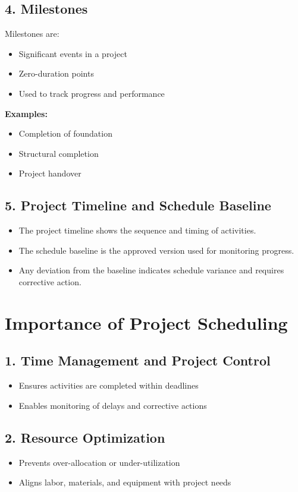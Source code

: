 \documentclass[12pt,a4paper]{article}
\begin{document}
\subsection*{4. Milestones}
Milestones are:
\begin{itemize}
    \item Significant events in a project
    \item Zero-duration points
    \item Used to track progress and performance
\end{itemize}

\textbf{Examples:}
\begin{itemize}
    \item Completion of foundation
    \item Structural completion
    \item Project handover
\end{itemize}

\subsection*{5. Project Timeline and Schedule Baseline}
\begin{itemize}
    \item The project timeline shows the sequence and timing of activities.
    \item The schedule baseline is the approved version used for monitoring progress.
    \item Any deviation from the baseline indicates schedule variance and requires corrective action.
\end{itemize}

\section*{Importance of Project Scheduling}

\subsection*{1. Time Management and Project Control}
\begin{itemize}
    \item Ensures activities are completed within deadlines
    \item Enables monitoring of delays and corrective actions
\end{itemize}

\subsection*{2. Resource Optimization}
\begin{itemize}
    \item Prevents over-allocation or under-utilization
    \item Aligns labor, materials, and equipment with project needs
\end{itemize}
\end{document}
